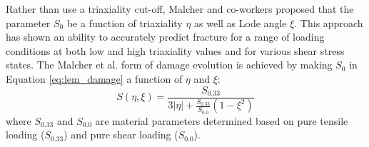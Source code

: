 \documentclass[sn-mathphys,Numbered]{sn-jnl}%
\begin{document}




Rather than use a triaxiality cut-off, Malcher and co-workers \citep{malcher_improved_2014, ferreira_improved_2022, castro_calibration_2018} proposed that the parameter $S_0$ be a function of triaxiality $\eta$ as well as Lode angle $\xi$.
This approach has shown an ability to accurately predict fracture for a range of loading conditions at both low and high triaxiality values and for various shear stress states.
The Malcher et al. form of damage evolution is achieved by making $S_0$ in Equation \ref{eq:lem_damage} a function of $\eta$ and $\xi$:
\begin{equation}
S(\eta,\xi)=\frac{S_{0.33}}{3|\eta|+\frac{S_{0.33}}{S_{0.0}}\left(1-\xi^2\right)}
\end{equation}
where $S_{0.33}$ and $S_{0.0}$ are material parameters determined based on pure tensile loading ($S_{0.33}$) and pure shear loading ($S_{0.0}$).

%
\end{document}
